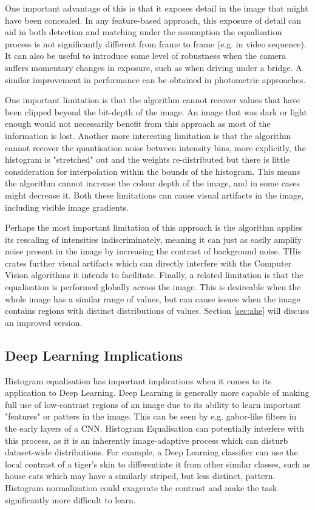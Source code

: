 \documentclass{article}
\begin{document}
One important advantage of this is that it exposes detail in the image that might have been concealed. In any feature-based approach, this exposure of detail can aid in both detection and matching under the assumption the equalisation process is not significantly different from frame to frame (e.g. in video sequence). It can also be useful to introduce some level of robustness when the camera suffers momentary changes in exposure, such as when driving under a bridge. A similar improvement in performance can be obtained in photometric approaches.

One important limitation is that the algorithm cannot recover values that have been clipped beyond the bit-depth of the image. An image that was dark or light enough would not necessarily benefit from this approach as most of the information is lost. Another more interesting limitation is that the algorithm cannot recover the quantisation noise between intensity bins, more explicitly, the histogram is "stretched" out and the weights re-distributed but there is little consideration for interpolation within the bounds of the histogram. This means the algorithm cannot increase the colour depth of the image, and in some cases might decrease it. Both these limitations can cause visual artifacts in the image, including visible image gradients.

Perhaps the most important limitation of this approach is the algorithm applies its rescaling of intensities indiscriminately, meaning it can just as easily amplify noise present in the image by increasing the contrast of background noise. THis crates further visual artifacts which can directly interfere with the Computer Vision algorithms it intends to facilitate. Finally, a related limitation is that the equalisation is performed globally across the image. This is desireable when the whole image has a similar range of values, but can cause issues when the image contains regions with distinct distributions of values. Section \ref{sec:ahe} will discuss an improved version.

\subsection{Deep Learning Implications}
Histogram equalisation has important implications when it comes to its application to Deep Learning. 
Deep Learning is generally more capable of making full use of low-contrast regions of an image due to its ability to learn important "features" or patters in the image. 
This can be seen by e.g. gabor-like filters in the early layers of a CNN. 
Histogram Equalisation can potentially interfere with this process, as it is an inherently image-adaptive process which can disturb dataset-wide distributions. 
For example, a Deep Learning classifier can use the local contrast of a tiger's skin to differentiate it from other similar classes, such as house cats which may have a similarly striped, but less distinct, pattern.
Histogram normalization could exagerate the contrast and make the task significantly more difficult to learn.
\end{document}
